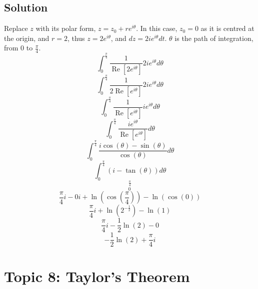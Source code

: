 \documentclass[12pt]{article}
\renewcommand{\Re}{\operatorname{Re}}
\begin{document}
\subsection{Solution}
Replace $z$ with its polar form, $z=z_0+re^{i\theta}$.  In this case, $z_0=0$ as it is centred at the origin, and $r=2$, thus $z=2e^{i\theta}$, and $dz=2ie^{i\theta}dt$.  $\theta$ is the path of integration, from $0$ to $\frac{\pi}{4}$.
\begin{equation}
    \int_0^{\frac{\pi}{4}}{\frac{1}{\Re[2e^{i\theta}]}2ie^{i\theta}}d\theta
\end{equation}\begin{equation}
    \int_0^{\frac{\pi}{4}}{\frac{1}{2\Re[e^{i\theta}]}2ie^{i\theta}}d\theta
\end{equation}
\begin{equation}
    \int_0^{\frac{\pi}{4}}{\frac{1}{\Re[e^{i\theta}]}ie^{i\theta}}d\theta
\end{equation}
\begin{equation}
	\int_0^{\frac{\pi}{4}}{\frac{ie^{i\theta}}{\Re[e^{i\theta}]}}d\theta
\end{equation}
\begin{equation}
    \int_0^{\frac{\pi}{4}}{\frac{i\cos(\theta)-\sin(\theta)}{\cos(\theta)}}d\theta
\end{equation}
\begin{equation}
    \int_0^{\frac{\pi}{4}}(i-\tan(\theta))d\theta
\end{equation}
\begin{equation}
	[i\theta + \ln(\cos(\theta))]_0^{\frac{\pi}{4}}
\end{equation}
\begin{equation}
	\frac{\pi}{4}i-0i+\ln(\cos(\frac{\pi}{4}))-\ln(\cos(0))
\end{equation}
\begin{equation}
	\frac{\pi}{4}i+\ln(2^{-\frac{1}{2}})-\ln(1)
\end{equation}
\begin{equation}
	\frac{\pi}{4}i-\frac{1}{2}\ln(2)-0
\end{equation}
\begin{equation}
	-\frac{1}{2}\ln(2)+\frac{\pi}{4}i
\end{equation}
\section{Topic 8: Taylor's Theorem}
\end{document}
